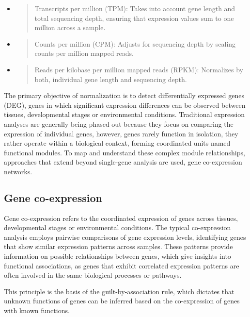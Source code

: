 \documentclass[
]{article}
\begin{document}
\begin{itemize}
\item
  \begin{quote}
  Transcripts per million (TPM): Takes into account gene length and
  total sequencing depth, ensuring that expression values sum to one
  million across a sample.
  \end{quote}
\item
  \begin{quote}
  Counts per million (CPM): Adjusts for sequencing depth by scaling
  counts per million mapped reads.
  \end{quote}
\item
  \begin{quote}
  Reads per kilobase per million mapped reads (RPKM): Normalizes by
  both, individual gene length and sequencing depth.
  \end{quote}
\end{itemize}

The primary objective of normalization is to detect differentially
expressed genes (DEG), genes in which significant expression differences
can be observed between tissues, developmental stages or environmental
conditions. Traditional expression analyses are generally being phased
out because they focus on comparing the expression of individual genes,
however, genes rarely function in isolation, they rather operate within
a biological context, forming coordinated units named functional
modules. To map and understand these complex module relationships,
approaches that extend beyond single-gene analysis are used, gene
co-expression networks.

\hypertarget{gene-co-expression}{%
\subsection{Gene co-expression}\label{gene-co-expression}}

Gene co-expression refers to the coordinated expression of genes across
tissues, developmental stages or environmental conditions. The typical
co-expression analysis employs pairwise comparisons of gene expression
levels, identifying genes that show similar expression patterns across
samples. These patterns provide information on possible relationships
between genes, which give insights into functional associations, as
genes that exhibit correlated expression patterns are often involved in
the same biological processes or pathways.

This principle is the basis of the guilt-by-association rule, which
dictates that unknown functions of genes can be inferred based on the
co-expression of genes with known functions.
\end{document}
